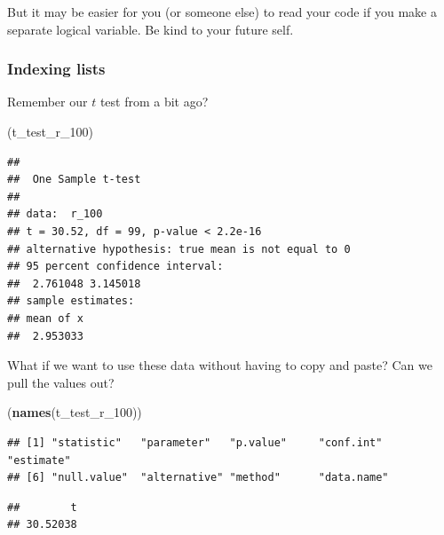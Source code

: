 \documentclass[]{article}
\newenvironment{Shaded}{\begin{snugshade}}{\end{snugshade}}
\newcommand{\KeywordTok}[1]{\textcolor[rgb]{0.13,0.29,0.53}{\textbf{#1}}}
\newcommand{\DecValTok}[1]{\textcolor[rgb]{0.00,0.00,0.81}{#1}}
\newcommand{\CommentTok}[1]{\textcolor[rgb]{0.56,0.35,0.01}{\textit{#1}}}
\newcommand{\OperatorTok}[1]{\textcolor[rgb]{0.81,0.36,0.00}{\textbf{#1}}}
\newcommand{\NormalTok}[1]{#1}
\begin{document}
But it may be easier for you (or someone else) to read your code if you
make a separate logical variable. Be kind to your future self.

\subsubsection{Indexing lists}\label{indexing-lists}

Remember our \(t\) test from a bit ago?

\begin{Shaded}
\begin{Highlighting}[]
\NormalTok{(t_test_r_}\DecValTok{100}\NormalTok{)}
\end{Highlighting}
\end{Shaded}

\begin{verbatim}
## 
##  One Sample t-test
## 
## data:  r_100
## t = 30.52, df = 99, p-value < 2.2e-16
## alternative hypothesis: true mean is not equal to 0
## 95 percent confidence interval:
##  2.761048 3.145018
## sample estimates:
## mean of x 
##  2.953033
\end{verbatim}

What if we want to use these data without having to copy and paste? Can
we pull the values out?

\begin{Shaded}
\begin{Highlighting}[]
\NormalTok{(}\KeywordTok{names}\NormalTok{(t_test_r_}\DecValTok{100}\NormalTok{))}
\end{Highlighting}
\end{Shaded}

\begin{verbatim}
## [1] "statistic"   "parameter"   "p.value"     "conf.int"    "estimate"   
## [6] "null.value"  "alternative" "method"      "data.name"
\end{verbatim}

\begin{Shaded}
\end{Shaded}

\begin{verbatim}
##        t 
## 30.52038
\end{verbatim}

\begin{Shaded}
\end{Shaded}
\end{document}
